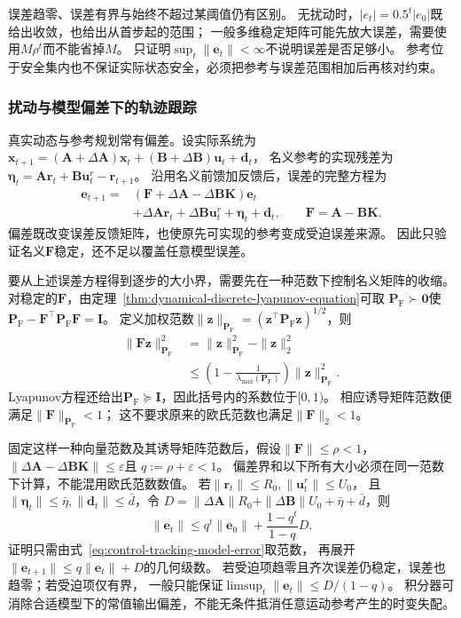 误差趋零、误差有界与始终不超过某阈值仍有区别。
无扰动时，$|e_t|=0.5^t|e_0|$既给出收敛，也给出从首步起的范围；
一般多维稳定矩阵可能先放大误差，需要使用$M\rho^t$而不能省掉$M$。
只证明$\sup_t\|\bm e_t\|<\infty$不说明误差是否足够小。
参考位于安全集内也不保证实际状态安全，必须把参考与误差范围相加后再核对约束。

\subsubsection{扰动与模型偏差下的轨迹跟踪}
真实动态与参考规划常有偏差。设实际系统为
$\bm x_{t+1}=(\bm A+\Delta\bm A)\bm x_t+
(\bm B+\Delta\bm B)\bm u_t+\bm d_t$，
名义参考的实现残差为
$\bm\eta_t=\bm A\bm r_t+\bm B\bm u_t^r-\bm r_{t+1}$。
沿用名义前馈加反馈后，误差的完整方程为
\begin{equation}
  \begin{aligned}
  \bm e_{t+1}
  ={}&(\bm F+\Delta\bm A-\Delta\bm B\bm K)\bm e_t\\
     &+\Delta\bm A\bm r_t+\Delta\bm B\bm u_t^r+\bm\eta_t+\bm d_t,
  \qquad \bm F=\bm A-\bm B\bm K.
  \end{aligned}
  \label{eq:control-tracking-model-error}
\end{equation}
偏差既改变误差反馈矩阵，也使原先可实现的参考变成受迫误差来源。
因此只验证名义$\bm F$稳定，还不足以覆盖任意模型误差。

要从上述误差方程得到逐步的大小界，需要先在一种范数下控制名义矩阵的收缩。
对稳定的$\bm F$，由定理~\ref{thm:dynamical-discrete-lyapunov-equation}可取
$\bm P_{\mathrm F}\succ\bm0$使
$\bm P_{\mathrm F}-\bm F^\top\bm P_{\mathrm F}\bm F=\bm I$。
定义加权范数$\|\bm z\|_{\bm P_{\mathrm F}}
=(\bm z^\top\bm P_{\mathrm F}\bm z)^{1/2}$，则
\[
  \begin{aligned}
  \|\bm F\bm z\|_{\bm P_{\mathrm F}}^2
  &=\|\bm z\|_{\bm P_{\mathrm F}}^2-\|\bm z\|_2^2\\
  &\leq\left(1-\frac1{\lambda_{\max}(\bm P_{\mathrm F})}\right)
          \|\bm z\|_{\bm P_{\mathrm F}}^2.
  \end{aligned}
\]
Lyapunov方程还给出$\bm P_{\mathrm F}\succeq\bm I$，因此括号内的系数位于$[0,1)$。
相应诱导矩阵范数便满足$\|\bm F\|_{\bm P_{\mathrm F}}<1$；
这不要求原来的欧氏范数也满足$\|\bm F\|_2<1$。

固定这样一种向量范数及其诱导矩阵范数后，假设$\|\bm F\|\leq\rho<1$，
$\|\Delta\bm A-\Delta\bm B\bm K\|\leq\varepsilon$且
$q:=\rho+\varepsilon<1$。
偏差界和以下所有大小必须在同一范数下计算，不能混用欧氏范数数值。
若$\|\bm r_t\|\leq R_0,\|\bm u_t^r\|\leq U_0$，
且$\|\bm\eta_t\|\leq\bar\eta,\|\bm d_t\|\leq\bar d$，令
$D=\|\Delta\bm A\|R_0+\|\Delta\bm B\|U_0+\bar\eta+\bar d$，则
\begin{equation}
  \|\bm e_t\|\leq q^t\|\bm e_0\|
         +\frac{1-q^t}{1-q}D.
  \label{eq:control-tracking-error-bound}
\end{equation}
证明只需由式~\eqref{eq:control-tracking-model-error}取范数，
再展开$\|\bm e_{t+1}\|\leq q\|\bm e_t\|+D$的几何级数。
若受迫项趋零且齐次误差仍稳定，误差也趋零；若受迫项仅有界，
一般只能保证$\limsup_t\|\bm e_t\|\leq D/(1-q)$。
积分器可消除合适模型下的常值输出偏差，不能无条件抵消任意运动参考产生的时变失配。

